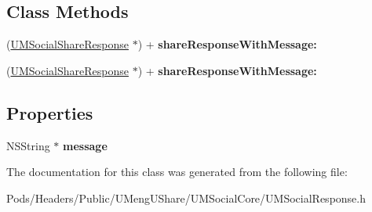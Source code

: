 \subsection*{Class Methods}
\begin{DoxyCompactItemize}
\item 
\mbox{\label{interface_u_m_social_share_response_aaecb392d57c94c2c7f6ef5cdb092e161}} 
(\mbox{\hyperlink{interface_u_m_social_share_response}{U\+M\+Social\+Share\+Response}} $\ast$) + {\bfseries share\+Response\+With\+Message\+:}
\item 
\mbox{\label{interface_u_m_social_share_response_aaecb392d57c94c2c7f6ef5cdb092e161}} 
(\mbox{\hyperlink{interface_u_m_social_share_response}{U\+M\+Social\+Share\+Response}} $\ast$) + {\bfseries share\+Response\+With\+Message\+:}
\end{DoxyCompactItemize}
\subsection*{Properties}
\begin{DoxyCompactItemize}
\item 
\mbox{\label{interface_u_m_social_share_response_aa274ce0eb4e2f27da26e7939af211931}} 
N\+S\+String $\ast$ {\bfseries message}
\end{DoxyCompactItemize}


The documentation for this class was generated from the following file\+:\begin{DoxyCompactItemize}
\item 
Pods/\+Headers/\+Public/\+U\+Meng\+U\+Share/\+U\+M\+Social\+Core/U\+M\+Social\+Response.\+h\end{DoxyCompactItemize}
